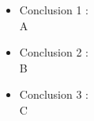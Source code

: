 \documentclass[preprint,12pt]{elsarticle}
\begin{document}
\begin{itemize}

\item Conclusion 1 : \\ A

\item Conclusion 2 : \\ B

\item Conclusion 3 : \\ C

\end{itemize}


	
	\newpage
	
		 
	
	
\end{document}
